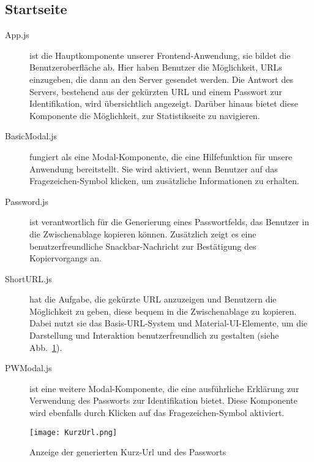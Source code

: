 \documentclass[a4paper,11pt,DIV=12]{scrreprt}%
\begin{document}
\subsection{Startseite}
\begin{description}%
    \item[App.js] ist die Hauptkomponente unserer Frontend-Anwendung, sie bildet die Benutzeroberfläche ab. Hier haben Benutzer die Möglichkeit, \ac{URL}s einzugeben, die dann an den Server gesendet werden. Die Antwort des Servers, bestehend aus der gekürzten \ac{URL} und einem Passwort zur Identifikation, wird übersichtlich angezeigt. Darüber hinaus bietet diese Komponente die Möglichkeit, zur Statistikseite zu navigieren.

    \item[BasicModal.js] fungiert als eine Modal-Komponente, die eine Hilfefunktion für unsere Anwendung bereitstellt. Sie wird aktiviert, wenn Benutzer auf das Fragezeichen-Symbol klicken, um zusätzliche Informationen zu erhalten.

    \item[Password.js] ist verantwortlich für die Generierung eines Passwortfelds, das Benutzer in die Zwischenablage kopieren können. Zusätzlich zeigt es eine benutzerfreundliche Snackbar-Nachricht zur Bestätigung des Kopiervorgangs an.

    \item[ShortURL.js] hat die Aufgabe, die gekürzte \ac{URL} anzuzeigen und Benutzern die Möglichkeit zu geben, diese bequem in die Zwischenablage zu kopieren. Dabei nutzt sie das Basis-\ac{URL}-System und Material-UI-Elemente, um die Darstellung und Interaktion benutzerfreundlich zu gestalten (siehe Abb.~\ref{fig:KurzUrl}).

    \item[PWModal.js] ist eine weitere Modal-Komponente, die eine ausführliche Erklärung zur Verwendung des Passworts zur Identifikation bietet. Diese Komponente wird ebenfalls durch Klicken auf das Fragezeichen-Symbol aktiviert.
\end{description}

\begin{figure}[h]%
    \begin{small}%
        \begin{center}%
            \texttt{[image: KurzUrl.png]}%
        \end{center}%
        \caption{Anzeige der generierten Kurz-Url und des Passworts}%
        \label{fig:KurzUrl}%
    \end{small}%
\end{figure}%
\end{document}
